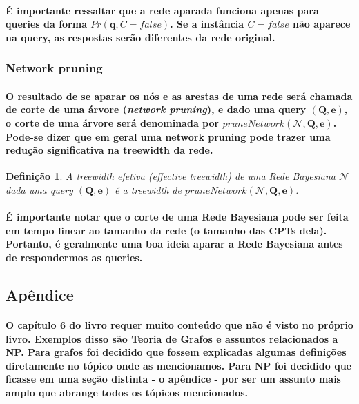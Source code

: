 \documentclass[a4paper,10pt]{article}
\theoremstyle{plain}
\newtheorem*{spn-def}{Definição}
\begin{document}
\paragraph{
  É importante ressaltar que a rede aparada funciona apenas para queries da forma $Pr(\mathbf{q},
  C = false)$. Se a instância $C = false$ não aparece na query, as respostas serão diferentes da
  rede original.
}

\subsubsection{Network pruning}

\paragraph{
  O resultado de se aparar os nós e as arestas de uma rede será chamada de corte de uma árvore
  (\textit{network pruning}), e dado uma query $(\mathbf{Q}, \mathbf{e})$, o corte de uma árvore
  será denominada por $pruneNetwork(\mathcal{N}, \mathbf{Q}, \mathbf{e})$. Pode-se dizer que em
  geral uma network pruning pode trazer uma redução significativa na treewidth da rede.
}

\begin{spn-def} A treewidth efetiva (\textit{effective treewidth}) de uma Rede Bayesiana
  $\mathcal{N}$ dada uma query $(\mathbf{Q}, \mathbf{e})$ é a treewidth de $pruneNetwork(\mathcal{N},
  \mathbf{Q}, \mathbf{e})$.
\end{spn-def}

\paragraph{
  É importante notar que o corte de uma Rede Bayesiana pode ser feita em tempo linear ao tamanho da
  rede (o tamanho das CPTs dela). Portanto, é geralmente uma boa ideia aparar a Rede Bayesiana antes
  de respondermos as queries.
}

\subsection{Apêndice}

\paragraph{
  O capítulo 6 do livro\cite{bayes-net-darwiche} requer muito conteúdo que não é visto no próprio
  livro. Exemplos disso são Teoria de Grafos e assuntos relacionados a NP. Para grafos foi decidido
  que fossem explicadas algumas definições diretamente no tópico onde as mencionamos. Para NP foi
  decidido que ficasse em uma seção distinta - o apêndice - por ser um assunto mais amplo que
  abrange todos os tópicos mencionados.
}
\end{document}
